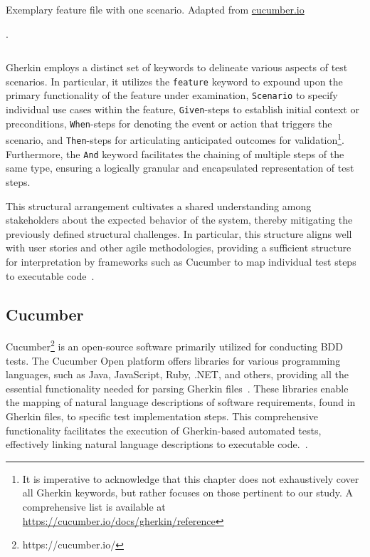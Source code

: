 \begin{listing}[!ht]
\caption{Exemplary feature file with one scenario. Adapted from 
\href{https://cucumber.io/blog/bdd/getting-started-with-bdd-part-1/}{cucumber.io}~\cite{noauthor_getting_nodate}}.
\label{lst:withdrawcash}
\inputminted{gherkin}{files/code/atm.feature}
\end{listing}

 Gherkin employs a distinct set of keywords to delineate various aspects of test scenarios. In particular, it utilizes the \texttt{feature} keyword to expound upon the primary functionality of the feature under examination, \texttt{Scenario} to specify individual use cases within the feature, \texttt{Given}-steps to establish initial context or preconditions, \texttt{When}-steps for denoting the event or action that triggers the scenario, and \texttt{Then}-steps for articulating anticipated outcomes for validation\footnote{It is imperative to acknowledge that this chapter does not exhaustively cover all Gherkin keywords, but rather focuses on those pertinent to our study. A comprehensive list is available at \href{https://cucumber.io/docs/gherkin/reference/\#keywords}{https://cucumber.io/docs/gherkin/reference}}. Furthermore, the \texttt{And} keyword facilitates the chaining of multiple steps of the same type, ensuring a logically granular and encapsulated representation of test steps. 
 
 This structural arrangement cultivates a shared understanding among stakeholders about the expected behavior of the system, thereby mitigating the previously defined structural challenges. In particular, this structure aligns well with user stories and other agile methodologies, providing a sufficient structure for interpretation by frameworks such as Cucumber to map individual test steps to executable code~\cite{noauthor_gherkin_nodate}.


\subsection{Cucumber}
\label{subsec:cucumber}
Cucumber\footnote{https://cucumber.io/} is an open-source software primarily utilized for conducting \ac{BDD} tests. The Cucumber Open platform offers libraries for various programming languages, such as Java, JavaScript, Ruby, .NET, and others, providing all the essential functionality needed for parsing Gherkin files~\cite{noauthor_cucumber_nodate}. These libraries enable the mapping of natural language descriptions of software requirements, found in Gherkin files, to specific test implementation steps. This comprehensive functionality facilitates the execution of Gherkin-based automated tests, effectively linking natural language descriptions to executable code.~\cite{wynne2012cucumber}.

